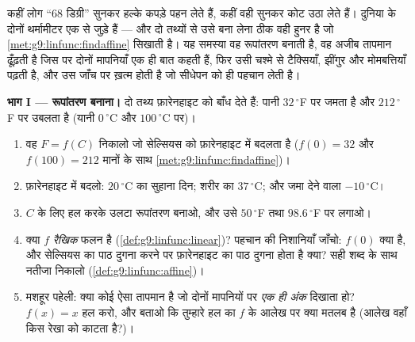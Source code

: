 \begin{problem}
\label{pb:g9:linfunc:1}
कहीं लोग ``$68$ डिग्री'' सुनकर हल्के कपड़े पहन लेते हैं, कहीं वही
सुनकर कोट उठा लेते हैं। दुनिया के दोनों थर्मामीटर एक  से
जुड़े हैं --- और दो तथ्यों से उसे बना लेना ठीक वही हुनर है जो
\cref{met:g9:linfunc:findaffine} सिखाती है। यह समस्या वह रूपांतरण
बनाती है, वह अजीब तापमान ढूँढ़ती है जिस पर दोनों मापनियाँ एक ही बात
कहती हैं, फिर उसी चश्मे से टैक्सियाँ, झींगुर और मोमबत्तियाँ पढ़ती है,
और उस जाँच पर ख़त्म होती है जो सीधेपन को ही पहचान लेती है।

\medskip
\noindent\textbf{भाग I --- रूपांतरण बनाना।}
दो तथ्य फ़ारेनहाइट  को बाँध देते हैं: पानी $32\,^\circ$F पर जमता
है और $212\,^\circ$F पर उबलता है (यानी $0\,^\circ$C और
$100\,^\circ$C पर)।
\begin{enumerate}
  \item वह  $F = f(C)$ निकालो जो सेल्सियस को फ़ारेनहाइट में
        बदलता है ($f(0) = 32$ और $f(100) = 212$ मानों के साथ
        \cref{met:g9:linfunc:findaffine})।
  \item फ़ारेनहाइट में बदलो: $20\,^\circ$C का सुहाना दिन; शरीर का
        $37\,^\circ$C; और जमा देने वाला $-10\,^\circ$C।
  \item $C$ के लिए हल करके उलटा रूपांतरण बनाओ, और उसे $50\,^\circ$F
        तथा $98.6\,^\circ$F पर लगाओ।
  \item क्या $f$ \emph{रैखिक} फलन है
        (\cref{def:g9:linfunc:linear})? पहचान की निशानियाँ जाँचो:
        $f(0)$ क्या है, और सेल्सियस का पाठ दुगना करने पर फ़ारेनहाइट
        का पाठ दुगना होता है क्या? सही शब्द के साथ नतीजा निकालो
        (\cref{def:g9:linfunc:affine})।
  \item मशहूर पहेली: क्या कोई ऐसा तापमान है जो दोनों मापनियों पर
        \emph{एक ही अंक} दिखाता हो? $f(x) = x$ हल करो, और बताओ कि
        तुम्हारे हल का $f$ के आलेख पर क्या मतलब है (आलेख वहाँ किस
        रेखा को काटता है?)।
\end{enumerate}


\end{problem}
